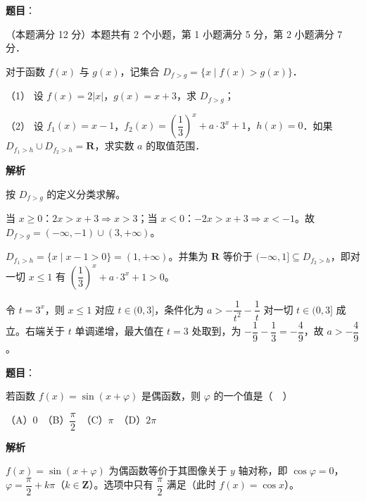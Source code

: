 \begin{answer}

\textbf{题目}：

（本题满分 12 分）本题共有 2 个小题，第 1 小题满分 5 分，第 2 小题满分 7 分．

对于函数 \(f(x)\) 与 \(g(x)\)，记集合 \(D_{f>g}=\{x\mid f(x)>g(x)\}\)．

（1） 设 \(f(x)=2|x|\)，\(g(x)=x+3\)，求 \(D_{f>g}\)；

（2） 设 \(f_{1}(x)=x-1\)，\(f_{2}(x)=\left(\dfrac{1}{3}\right)^{x}+a\cdot 3^{x}+1\)，\(h(x)=0\)．如果 \(D_{f_{1}>h}\cup D_{f_{2}>h}=\mathbf{R}\)，求实数 \(a\) 的取值范围．

\textbf{解析}

按 \(D_{f>g}\) 的定义分类求解。


当 \(x\geqslant 0\)：\(2x>x+3\Rightarrow x>3\)；当 \(x<0\)：\(-2x>x+3\Rightarrow x<-1\)。故 \(D_{f>g}=(-\infty,-1)\cup(3,+\infty)\)。


\(D_{f_{1}>h}=\{x\mid x-1>0\}=(1,+\infty)\)。并集为 \(\mathbf{R}\) 等价于 \((-\infty,1]\subseteq D_{f_{2}>h}\)，即对一切 \(x\leqslant 1\) 有 \(\left(\dfrac{1}{3}\right)^{x}+a\cdot 3^{x}+1>0\)。

令 \(t=3^{x}\)，则 \(x\leqslant 1\) 对应 \(t\in(0,3]\)，条件化为 \(a>-\dfrac{1}{t^{2}}-\dfrac{1}{t}\) 对一切 \(t\in(0,3]\) 成立。右端关于 \(t\) 单调递增，最大值在 \(t=3\) 处取到，为 \(-\dfrac{1}{9}-\dfrac{1}{3}=-\dfrac{4}{9}\)，故 \(a>-\dfrac{4}{9}\)。



\end{answer}
\begin{answer}

\textbf{题目}：

若函数 \(f(x)=\sin(x+\varphi)\) 是偶函数，则 \(\varphi\) 的一个值是（　）

（A）0　（B）\(\dfrac{\pi}{2}\)　（C）\(\pi\)　（D）\(2\pi\)

\textbf{解析}

\(f(x)=\sin(x+\varphi)\) 为偶函数等价于其图像关于 \(y\) 轴对称，即 \(\cos\varphi=0\)，\(\varphi=\dfrac{\pi}{2}+k\pi\)（\(k\in\mathbf{Z}\)）。选项中只有 \(\dfrac{\pi}{2}\) 满足（此时 \(f(x)=\cos x\)）。


\end{answer}
